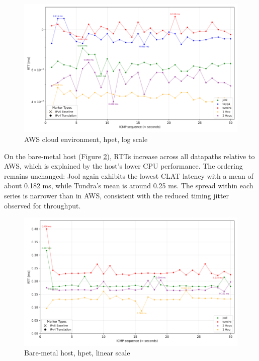 \begin{figure}[H]
    \centering
    \includegraphics[width=1\textwidth]{resources/plots/CombinedPlot/RTT/AWS_ping_rtt_Ping_30s_log.png}
    \caption{AWS cloud environment, hpet, log scale}
    \label{fig:AWS_icmp_sameScale_hpet_log}

\end{figure}

On the bare-metal host (Figure \ref{fig:Local_icmp_sameScale_hpet_linear}), RTTs increase across all datapaths relative to AWS, which is explained by the host’s lower CPU performance. The ordering remains unchanged: Jool again exhibits the lowest CLAT latency with a mean of about 0.182 ms, while Tundra’s mean is around 0.25 ms. The spread within each series is narrower than in AWS, consistent with the reduced timing jitter observed for throughput.

\begin{figure}[H]
    \centering
    \includegraphics[width=1\textwidth]{resources/plots/CombinedPlot/RTT/Single_ping_rtt_Ping_30s_linear.png}
    \caption{Bare-metal host, hpet, linear scale}
    \label{fig:Local_icmp_sameScale_hpet_linear}
\end{figure}

